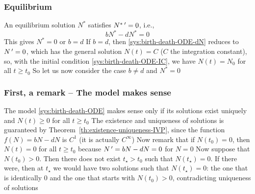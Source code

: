 \documentclass[aspectratio=169]{beamer}
\begin{document}
\begin{frame}\frametitle{Equilibrium}
An equilibrium solution $N^*$ satisfies $N^*\,'=0$, i.e.,
\[
bN^*-dN^*=0
\]
\vfill
This gives $N^*=0$ or $b=d$
\vfill 
If $b=d$, then \eqref{sys:birth-death-ODE-dN} reduces to $N\,'=0$, which has the general solution $N(t)=C$ ($C$ the integration constant), so, with the initial condition \eqref{sys:birth-death-ODE-IC}, we have $N(t)=N_0$ for all $t\geq t_0$
\vfill
So let us now consider the case $b\neq d$ and $N^*=0$
\end{frame}

\begin{frame}\frametitle{First, a remark -- The model makes sense}
The model \eqref{sys:birth-death-ODE} makes sense only if its solutions exist uniquely and $N(t)\geq 0$ for all $t\geq t_0$
\vfill
The existence and uniqueness of solutions is guaranteed by Theorem~\ref{th:existence-uniqueness-IVP}, since the function $f(N)=bN-dN$ is $C^1$ (it is actually $C^\infty$)
\vfill
Now remark that if $N(t_0)=0$, then $N(t)=0$ for all $t\geq t_0$ because $N\,'=bN-dN=0$ for $N=0$
\vfill
Now suppose that $N(t_0)>0$. Then there does not exist $t_\star>t_0$ such that $N(t_\star)=0$. 
If there were, then at $t_\star$ we would have two solutions such that $N(t_\star)=0$: the one that is identically 0 and the one that starts with $N(t_0)>0$, contradicting uniqueness of solutions
\end{frame}


\begin{frame}
\begin{center}
\end{center}  
\end{frame}

\end{document}
